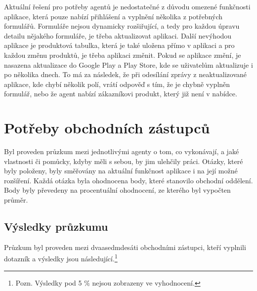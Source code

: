 \documentclass[11pt,twoside,a4paper]{book}
\begin{document}
Aktuální řešení pro potřeby agentů je nedostatečné z důvodu omezené funkčnosti aplikace, která pouze nabízí přihlášení a vyplnění několika z potřebných formulářů. Formuláře nejsou dynamicky rozšiřující, a tedy pro každou úpravu detailu nějakého formuláře, je třeba aktualizovat aplikaci. Další nevýhodou aplikace je produktová tabulka, která je také uložena přímo v aplikaci a pro každou změnu produktů, je třeba aplikaci změnit. Pokud se aplikace změní, je nasazena aktualizace do Google Play a Play Store, kde se uživatelům aktualizuje i po několika dnech. To má za následek, že při odesílání zprávy z neaktualizované aplikace, kde chybí několik polí, vrátí odpověď s tím, že je chybně vyplněn formulář, nebo že agent nabízí zákazníkovi produkt, který již není v nabídce.

\section{Potřeby obchodních zástupců}
Byl proveden průzkum mezi jednotlivými agenty o tom, co vykonávají, a jaké vlastnosti či pomůcky, kdyby měli s sebou, by jim ulehčily práci. Otázky, které byly položeny, byly směřovány na aktuální funkčnost aplikace i na její možné rozšíření. Každá otázka byla ohodnocena body, které stanovilo obchodní oddělení. Body byly převedeny na procentuální ohodnocení, ze kterého byl vypočten průměr.

\subsection{Výsledky průzkumu}
Průzkum byl proveden mezi dvaasedmdesáti obchodními zástupci, kteří vyplnili dotazník a výsledky jsou následující.\footnote{Pozn. Výsledky pod 5 \% nejsou zobrazeny ve vyhodnocení.} 
\end{document}
